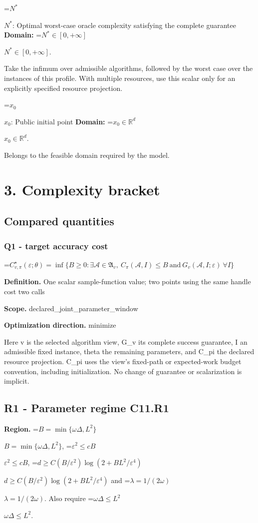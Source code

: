 \documentclass[10pt,a4paper]{article}
\newcommand{\AtlasMath}[1]{\par\begingroup\centering\setbox0=\hbox{$\displaystyle #1$}\ifdim\wd0>1.4\linewidth\typeout{ATLAS WIDE FORMULA: \the\wd0}\fi\ifdim\wd0>\linewidth\resizebox{\linewidth}{!}{\box0}\else\box0\fi\par\endgroup}
\newcommand{\AtlasInlineMath}[1]{\begingroup\setbox0=\hbox{$#1$}\ifdim\wd0>.4\linewidth\endgroup\AtlasMath{#1}\else\endgroup$#1$\fi}
\begin{document}
\AtlasInlineMath{N^*}: Optimal worst-case oracle complexity satisfying the complete guarantee \textbf{Domain:} \AtlasInlineMath{N^*\in[0,+\infty]}.

Take the infimum over admissible algorithms, followed by the worst case over the instances of this profile. With multiple resources, use this scalar only for an explicitly specified resource projection.

\AtlasInlineMath{x_0}: Public initial point \textbf{Domain:} \AtlasInlineMath{x_0\in\mathbb{R}^d}.

Belongs to the feasible domain required by the model.

\section{3. Complexity bracket}
\subsection{Compared quantities}
\subsubsection{Q1 - target accuracy cost}
\AtlasMath{C^\star_{v,\pi}(\varepsilon;\theta)=\inf\{B\ge0:\exists\mathcal A\in\mathfrak A_v,\ C_\pi(\mathcal A,I)\le B\ \text{and}\ G_v(\mathcal A,I;\varepsilon)\ \forall I\}}
\textbf{Definition.} One scalar sample-function value; two points using the same handle cost two calls

\textbf{Scope.} declared\_joint\_parameter\_window

\textbf{Optimization direction.} minimize

Here v is the selected algorithm view, G\_v its complete success guarantee, I an admissible fixed instance, theta the remaining parameters, and C\_pi the declared resource projection. C\_pi uses the view's fixed-path or expected-work budget convention, including initialization. No change of guarantee or scalarization is implicit.

\subsection{R1 - Parameter regime C11.R1}
\textbf{Region.} \AtlasInlineMath{B=\min\{\omega\Delta,L^2\}}, \AtlasInlineMath{\varepsilon^2\le cB}, \AtlasInlineMath{d\ge C(B/\varepsilon^2)\log(2+BL^2/\varepsilon^4)} and \AtlasInlineMath{\lambda=1/(2\omega)}. Also require \AtlasInlineMath{\omega\Delta\le L^2}.
\end{document}
